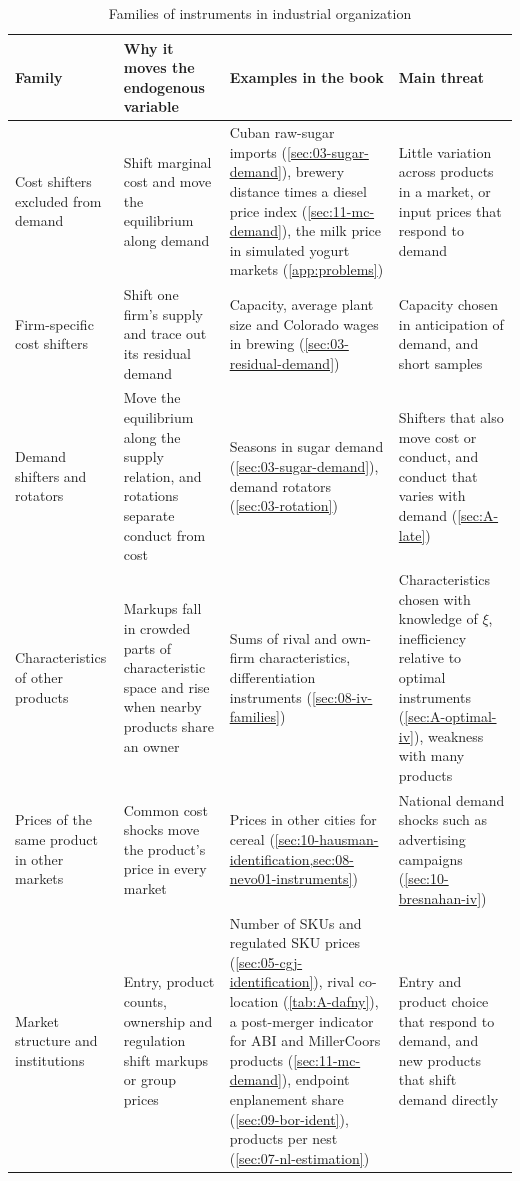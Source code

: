 \begin{table}[htbp]
\centering
\caption{Families of instruments in industrial organization}
\label{tab:A-instruments}
\footnotesize
\begin{tabularx}{\textwidth}{@{}>{\raggedright\arraybackslash}p{}
>{\raggedright\arraybackslash}X >{\raggedright\arraybackslash}X >{\raggedright\arraybackslash}X@{}}
\toprule
Family & Why it moves the endogenous variable & Examples in the book & Main threat \\
\midrule
Cost shifters excluded from demand & Shift marginal cost and move the equilibrium along demand &
Cuban raw-sugar imports (\cref{sec:03-sugar-demand}), brewery distance times a diesel price index
(\cref{sec:11-mc-demand}), the milk price in simulated yogurt markets (\cref{app:problems}) &
Little variation across products in a market, or input prices that respond to demand \\
\addlinespace
Firm-specific cost shifters & Shift one firm's supply and trace out its residual demand & Capacity, average
plant size and Colorado wages in brewing (\cref{sec:03-residual-demand}) & Capacity chosen in anticipation of
demand, and short samples \\
\addlinespace
Demand shifters and rotators & Move the equilibrium along the supply relation, and rotations separate conduct
from cost & Seasons in sugar demand (\cref{sec:03-sugar-demand}), demand rotators (\cref{sec:03-rotation}) &
Shifters that also move cost or conduct, and conduct that varies with demand (\cref{sec:A-late}) \\
\addlinespace
Characteristics of other products & Markups fall in crowded parts of characteristic space and rise when
nearby products share an owner & Sums of rival and own-firm characteristics, differentiation instruments
(\cref{sec:08-iv-families}) & Characteristics chosen with knowledge of $\xi$, inefficiency relative to optimal
instruments (\cref{sec:A-optimal-iv}), weakness with many products \\
\addlinespace
Prices of the same product in other markets & Common cost shocks move the product's price in every market &
Prices in other cities for cereal (\cref{sec:10-hausman-identification,sec:08-nevo01-instruments}) & National
demand shocks such as advertising campaigns (\cref{sec:10-bresnahan-iv}) \\
\addlinespace
Market structure and institutions & Entry, product counts, ownership and regulation shift markups or group
prices & Number of SKUs and regulated SKU prices (\cref{sec:05-cgj-identification}), rival co-location
(\cref{tab:A-dafny}), a post-merger indicator for ABI and MillerCoors products (\cref{sec:11-mc-demand}), endpoint enplanement share
(\cref{sec:09-bor-ident}), products per nest (\cref{sec:07-nl-estimation}) & Entry and product choice that
respond to demand, and new products that shift demand directly \\
\bottomrule
\end{tabularx}


\end{table}
